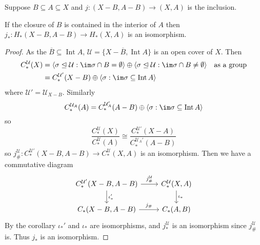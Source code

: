 \documentclass[a4paper]{article}
\DeclareMathOperator{\Int}{Int} %
\begin{document}
Suppose \(B \subseteq A \subseteq X\) and \(j: (X - B, A - B) \to (X, A)\) is the inclusion.

\begin{theorem}[excision]
  If the closure of \(B\) is contained in the interior of \(A\) then \(j_*: H_*(X - B, A - B) \to H_*(X, A)\) is an isomorphism.
\end{theorem}

\begin{proof}
  As the \(\overline B \subseteq \Int A\), \(\mathcal U = \{X - \overline B, \Int A\}\) is an open cover of \(X\). Then
  \begin{align*}
    C_*^{\mathcal U} (X)
    &= \langle \sigma \trianglelefteq \mathcal U: \im \sigma \cap B = \emptyset \rangle
    \oplus \langle \sigma \trianglelefteq \mathcal U: \im \sigma \cap B \ne \emptyset \rangle \quad \text{as a group} \\
    &= C_*^{\mathcal U'}(X - B) \oplus \langle \sigma: \im \sigma \subseteq \Int A \rangle
  \end{align*}
  where \(\mathcal U' = \mathcal U_{X - B}\). Similarly
  \[
    C_*^{\mathcal U_A}(A) = C_*^{\mathcal U_A'}(A - B) \oplus \langle \sigma: \im \sigma \subseteq \Int A \rangle
  \]
  so
  \[
    \frac{C_*^{\mathcal U}(X)}{C_*^{\mathcal U}(A)} \cong \frac{C_*^{\mathcal U'}(X - A)}{C_*^{\mathcal U_A'}(A - B)}
  \]
  so \(j_\#^{\mathcal U}: C_*^{\mathcal U'}(X - B, A - B) \to C_*^{\mathcal U}(X, A)\) is an isomorphism. Then we have a commutative diagram
  \[
    \begin{tikzcd}
      C_*^{\mathcal U'}(X - B, A - B) \ar[r, "j_\#^{\mathcal U}"] \ar[d, "\iota_*'"] & C_*^{\mathcal U}(X, A) \ar[d, "\iota_*"] \\
      C_*(X - B, A - B) \ar[r, "j_\#"] & C_*(A, B)
    \end{tikzcd}
  \]
  By the corollary \(\iota_*'\) and \(\iota_*\) are isomorphisms, and \(j^{\mathcal U}_*\) is an isomorphism since \(j^{\mathcal U}_\#\) is. Thus \(j_*\) is an isomorphism.
\end{proof}
\end{document}
